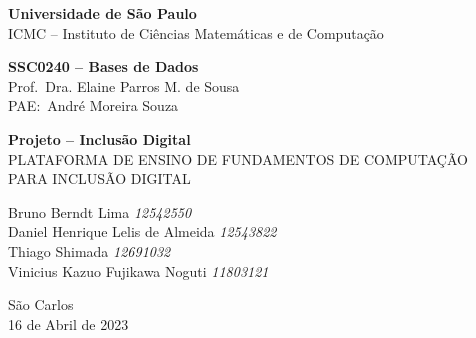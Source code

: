 \begin{capa}
    \begin{center}

        \vspace{1cm}

        {\Large\textbf{Universidade de São Paulo}} \\
        {\Large ICMC -- Instituto de Ciências Matemáticas e de Computação}\\

        \vspace{3cm}

        {
            \large
            \textbf{SSC0240 -- Bases de Dados} \\
            Prof.\ Dra. Elaine Parros M. de Sousa \\
            PAE:\ André Moreira Souza
        }

        \vspace{3cm}

        {\Large \textbf{Projeto -- Inclusão Digital}}\\
        {\large \uppercase{Plataforma de ensino de fundamentos de computação para inclusão digital}}\\

        \vspace{3cm}

        \begin{flushright}
            {
            {Bruno Berndt Lima \; \textit{12542550}} \\
            {Daniel Henrique Lelis de Almeida \; \textit{12543822}} \\
            {Thiago Shimada \; \textit{12691032}} \\
            {Vinicius Kazuo Fujikawa Noguti \; \textit{11803121}}
            }
        \end{flushright}

        \vfill

        {
            \large
            São Carlos \\
            16 de Abril de 2023
        }

    \end{center}
\end{capa}
